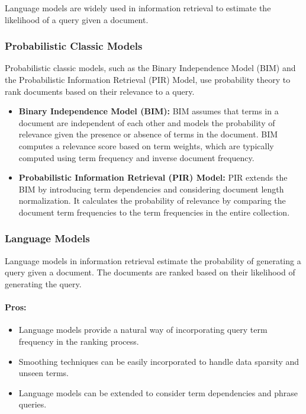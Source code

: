 \documentclass[12pt]{article}
\begin{document}
Language models are widely used in information retrieval to estimate the likelihood of a query given a document. 
\subsubsection{Probabilistic Classic Models}
\label{sec:probabilistic_classic_models}

Probabilistic classic models, such as the Binary Independence Model (BIM) and the Probabilistic Information Retrieval (PIR) Model, use probability theory to rank documents based on their relevance to a query.
\begin{itemize}
    \item \textbf{Binary Independence Model (BIM):} BIM assumes that terms in a document are independent of each other and models the probability of relevance given the presence or absence of terms in the document. BIM computes a relevance score based on term weights, which are typically computed using term frequency and inverse document frequency.
    \item \textbf{Probabilistic Information Retrieval (PIR) Model:} PIR extends the BIM by introducing term dependencies and considering document length normalization. It calculates the probability of relevance by comparing the document term frequencies to the term frequencies in the entire collection.
\end{itemize}

\subsubsection{Language Models}
\label{sec:language_models}
Language models in information retrieval estimate the probability of generating a query given a document. The documents are ranked based on their likelihood of generating the query.
\paragraph{Pros:}
\begin{itemize}
    \item Language models provide a natural way of incorporating query term frequency in the ranking process.
    \item Smoothing techniques can be easily incorporated to handle data sparsity and unseen terms.
    \item Language models can be extended to consider term dependencies and phrase queries.
\end{itemize}
\end{document}
